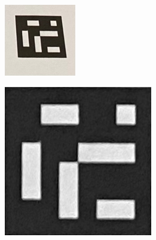 \documentclass[../Head/report.tex]{subfiles}
\begin{document}
\begin{figure}[H]
    \centering
    \begin{subfigure}[b]{.1525\textwidth}
        \centering
        \includegraphics[width=1\linewidth]{../Figures/aruco_detection1.png}
        \caption{}
        \label{fig:aruco_detection1}
    \end{subfigure}
    \begin{subfigure}[b]{.15\textwidth}
        \centering
        \includegraphics[width=1\linewidth]{../Figures/aruco_detection2.png}

\end{subfigure}
\end{figure}
\end{document}
